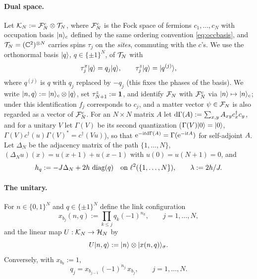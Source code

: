 \paragraph{Dual space.}
Let $\mathcal{K}_N:=\mathcal{F}^c_N\otimes\mathcal{T}_N$, where $\mathcal{F}^c_N$ is the Fock space of fermions $c_1,\dots,c_N$
with occupation basis $|n\rangle_c$ defined by the same ordering convention \eqref{eq:occbasis}, and
$\mathcal{T}_N=(\mathbb{C}^2)^{\otimes N}$ carries spins $\tau_j$ on the \emph{sites}, commuting with the $c$'s.
We use the orthonormal basis $|q\rangle$, $q\in\{\pm1\}^N$, of $\mathcal{T}_N$ with
\begin{equation}\label{eq:taubasis}
  \tau^{x}_{j}|q\rangle=q_j|q\rangle,\qquad \tau^{z}_{j}|q\rangle=|q^{(j)}\rangle,
\end{equation}
where $q^{(j)}$ is $q$ with $q_j$ replaced by $-q_j$ (this fixes the phases of the basis).  We
write $|n,q\rangle:=|n\rangle_c\otimes|q\rangle$, set $\tau^{z}_{N+1}:=\mathbf{1}$, and identify $\mathcal{F}_N$ with
$\mathcal{F}_N^c$ via $|n\rangle\mapsto|n\rangle_c$; under this identification $f_j$ corresponds to $c_j$, and
a matter vector $\psi\in\mathcal{F}_N$ is also regarded as a vector of $\mathcal{F}_N^c$.  For an $N\times N$
matrix $A$ let $\mathrm{d}\Gamma(A):=\sum_{x,y}A_{xy}c_x^\dagger c_y$, and for a unitary $V$ let $\Gamma(V)$
be its second quantization ($\Gamma(V)|0\rangle=|0\rangle$, $\Gamma(V)c^\dagger(u)\Gamma(V)^*=c^\dagger(Vu)$),
so that $\mathrm{e}^{-\mathrm{i} t\mathrm{d}\Gamma(A)}=\Gamma(\mathrm{e}^{-\mathrm{i} tA})$ for self-adjoint $A$.  Let $\Delta_N$ be the
adjacency matrix of the path $\{1,\dots,N\}$, $(\Delta_Nu)(x)=u(x+1)+u(x-1)$ with
$u(0)=u(N+1)=0$, and
\begin{equation}\label{eq:hq}
  h_{q}:=-J\Delta_N+2h\,\operatorname{diag}(q)\quad\text{on }\ell^2(\{1,\dots,N\}),\qquad \lambda:=2h/J .
\end{equation}

\paragraph{The unitary.}
For $n\in\{0,1\}^N$ and $q\in\{\pm1\}^N$ define the link configuration
\begin{equation}\label{eq:xnq}
  x_{b_j}(n,q):=\prod_{k\le j}q_k(-1)^{n_k},\qquad j=1,\dots,N,
\end{equation}
and the linear map $U:\mathcal{K}_N\to\mathcal{H}_N$ by
\begin{equation}\label{eq:U}
  U|n,q\rangle:=|n\rangle\otimes|x(n,q)\rangle_\sigma .
\end{equation}
Conversely, with $x_{b_0}:=1$,
\begin{equation}\label{eq:qofx}
  q_j=x_{b_{j-1}}\,(-1)^{n_j}\,x_{b_j},\qquad j=1,\dots,N .
\end{equation}

